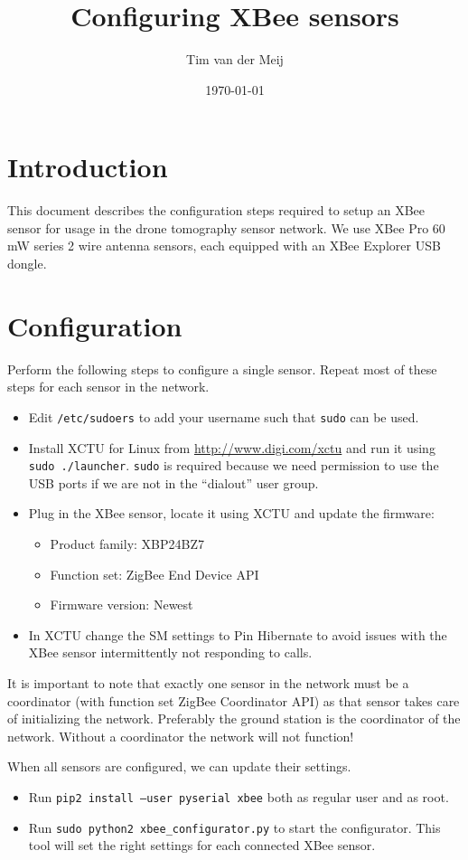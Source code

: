 \documentclass{article}
\begin{document}
\title{Configuring XBee sensors}
\author{Tim van der Meij}
\date{\today}

\maketitle

\section{Introduction}
This document describes the configuration steps required to setup an XBee sensor
for usage in the drone tomography sensor network. We use XBee Pro 60 mW series 2
wire antenna sensors, each equipped with an XBee Explorer USB dongle.

\section{Configuration}
Perform the following steps to configure a single sensor. Repeat most of these
steps for each sensor in the network.

\begin{itemize}
    \item Edit {\tt /etc/sudoers} to add your username such that {\tt sudo} can
          be used.
    \item Install XCTU for Linux from \url{http://www.digi.com/xctu} and run it
          using {\tt sudo~./launcher}. {\tt sudo} is required because we need
          permission to use the USB ports if we are not in the ``dialout'' user
          group.
    \item Plug in the XBee sensor, locate it using XCTU and update the firmware:
          \begin{itemize}
              \item Product family: XBP24BZ7
              \item Function set: ZigBee End Device API
              \item Firmware version: Newest
          \end{itemize}
    \item In XCTU change the SM settings to Pin Hibernate to avoid issues
          with the XBee sensor intermittently not responding to calls.
\end{itemize}

It is important to note that exactly one sensor in the network must be a
coordinator (with function set ZigBee Coordinator API) as that sensor takes
care of initializing the network. Preferably the ground station is the coordinator
of the network. Without a coordinator the network will not function!

When all sensors are configured, we can update their settings.

\begin{itemize}
    \item Run {\tt pip2 install --user pyserial xbee} both as regular user and
          as root.
    \item Run {\tt sudo python2 xbee\_configurator.py} to start the configurator.
          This tool will set the right settings for each connected XBee sensor.
\end{itemize}
\end{document}
